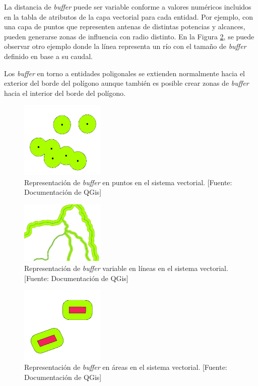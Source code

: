La distancia de \textit{buffer} puede ser variable conforme a valores numéricos incluidos en la tabla de atributos de la capa vectorial para cada entidad. Por ejemplo, con una capa de puntos que representen antenas de distintas potencias y alcances, pueden generarse zonas de influencia con radio distinto. En la Figura \ref{fig:lineBuffer}, se puede observar otro ejemplo donde la línea representa un río con el tamaño de \textit{buffer} definido en base a su caudal.

Los \textit{buffer} en torno a entidades poligonales se extienden normalmente hacia el exterior del borde del polígono aunque también es posible crear zonas de \textit{buffer} hacia el interior del borde del polígono.

\begin{figure}[H]
    \centering
    \includegraphics[width=4cm]{point_buffer.png}
    \caption{Representación de \textit{buffer} en puntos en el sistema vectorial. [Fuente: Documentación de QGis]}
    \label{fig:pointBuffer}
\end{figure}

\begin{figure}[H]
    \centering
    \includegraphics[width=4cm]{variable_line_buffer.png}
    \caption{Representación de \textit{buffer} variable en líneas en el sistema vectorial. [Fuente: Documentación de QGis]}
    \label{fig:lineBuffer}
\end{figure}

\begin{figure}[H]
    \centering
    \includegraphics[width=4cm]{polygon_buffer.png}
    \caption{Representación de \textit{buffer} en áreas en el sistema vectorial. [Fuente: Documentación de QGis]}
    \label{fig:polygonBuffer}
\end{figure}

